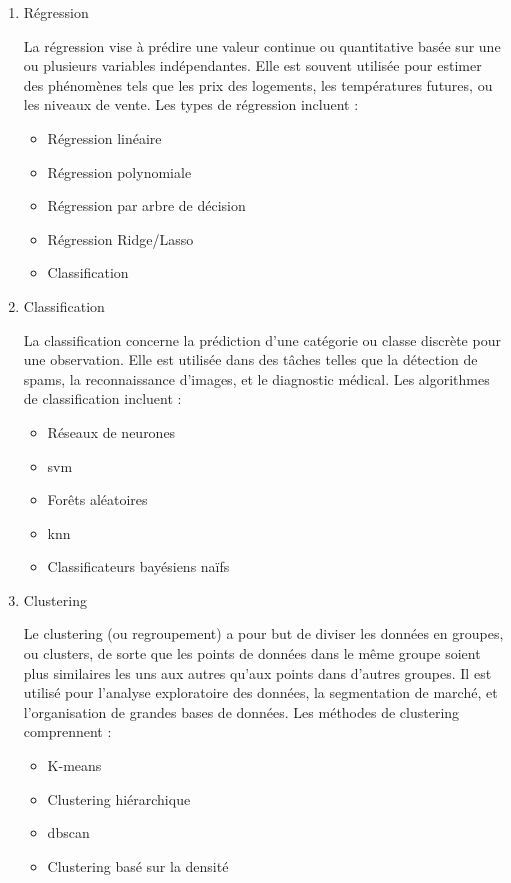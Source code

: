 \begin{enumerate}
    \item Régression
    
    La régression vise à prédire une valeur continue ou quantitative basée sur une ou plusieurs variables indépendantes. Elle est souvent utilisée pour estimer des phénomènes tels que les prix des logements, les températures futures, ou les niveaux de vente. Les types de régression incluent :
    
    \begin{itemize}
        \item Régression linéaire
        \item Régression polynomiale
        \item Régression par arbre de décision
        \item Régression Ridge/Lasso
        \item Classification
    \end{itemize}    

    \item Classification
    
    La classification concerne la prédiction d'une catégorie ou classe discrète pour une observation. Elle est utilisée dans des tâches telles que la détection de spams, la reconnaissance d'images, et le diagnostic médical. Les algorithmes de classification incluent :

        \begin{itemize}
            \item Réseaux de neurones
            \item \ac{svm}
            \item Forêts aléatoires
            \item \ac{knn}
            \item Classificateurs bayésiens naïfs
        \end{itemize}

    \item Clustering
    
    Le clustering (ou regroupement) a pour but de diviser les données en groupes, ou clusters, de sorte que les points de données dans le même groupe soient plus similaires les uns aux autres qu'aux points dans d'autres groupes. Il est utilisé pour l'analyse exploratoire des données, la segmentation de marché, et l'organisation de grandes bases de données. Les méthodes de clustering comprennent :

       \begin{itemize}
            \item K-means
            \item Clustering hiérarchique
            \item \ac{dbscan}
            \item Clustering basé sur la densité
       \end{itemize}


\end{enumerate}
